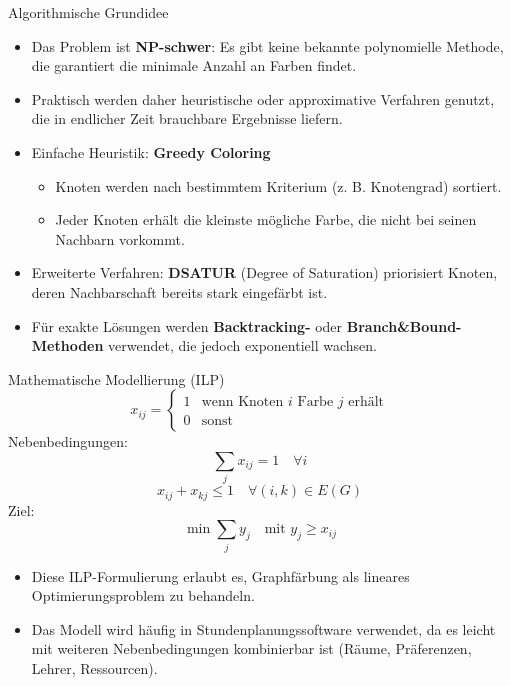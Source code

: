 \documentclass[10pt]{beamer}
\begin{document}
\begin{frame}{Algorithmische Grundidee}
    \small
    \begin{itemize}
        \item Das Problem ist \textbf{NP-schwer}: Es gibt keine bekannte polynomielle Methode, die garantiert die minimale Anzahl an Farben findet.
        \item Praktisch werden daher heuristische oder approximative Verfahren genutzt, die in endlicher Zeit brauchbare Ergebnisse liefern.
        \item Einfache Heuristik: \textbf{Greedy Coloring}
        \begin{itemize}
            \item Knoten werden nach bestimmtem Kriterium (z. B. Knotengrad) sortiert.
            \item Jeder Knoten erhält die kleinste mögliche Farbe, die nicht bei seinen Nachbarn vorkommt.
        \end{itemize}
        \item Erweiterte Verfahren: \textbf{DSATUR} (Degree of Saturation) priorisiert Knoten, deren Nachbarschaft bereits stark eingefärbt ist.
        \item Für exakte Lösungen werden \textbf{Backtracking-} oder \textbf{Branch\&Bound-Methoden} verwendet, die jedoch exponentiell wachsen.
    \end{itemize}
\end{frame}

\begin{frame}{Mathematische Modellierung (ILP)}
    \small
    \[
        x_{ij} =
        \begin{cases}
            1 & \text{wenn Knoten } i \text{ Farbe } j \text{ erhält} \\
            0 & \text{sonst}
        \end{cases}
    \]
    Nebenbedingungen:
    \[
        \sum_j x_{ij} = 1 \quad \forall i
    \]
    \[
        x_{ij} + x_{kj} \le 1 \quad \forall (i,k) \in E(G)
    \]
    Ziel:
    \[
        \min \sum_j y_j \quad \text{mit } y_j \ge x_{ij}
    \]

    \vspace{0.5em}
    \begin{itemize}
        \item Diese ILP-Formulierung erlaubt es, Graphfärbung als lineares Optimierungsproblem zu behandeln.
        \item Das Modell wird häufig in Stundenplanungssoftware verwendet, da es leicht mit weiteren Nebenbedingungen kombinierbar ist (Räume, Präferenzen, Lehrer, Ressourcen).
    \end{itemize}
\end{frame}
\end{document}
